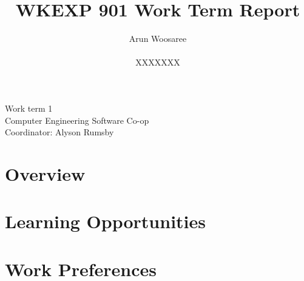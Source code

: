 \documentclass[letterpaper,12pt]{article}
\title{WKEXP 901 Work Term Report}
\author{Arun Woosaree \\ \\  XXXXXXX}
\begin{document}
\begin{titlepage}
\maketitle
\thispagestyle{empty}
\centering
\large
\vspace{1cm}
Work term 1\\
\vspace{1cm}
Computer Engineering Software Co-op \\
\vspace{1cm}
Coordinator: Alyson Rumsby
\end{titlepage}

\section{Overview}
\lipsum[0-5]

\section{Learning Opportunities}
\lipsum[6-11]

\section{Work Preferences}
\lipsum[12-17]


\nocite{atbwebsite}

\end{document}

